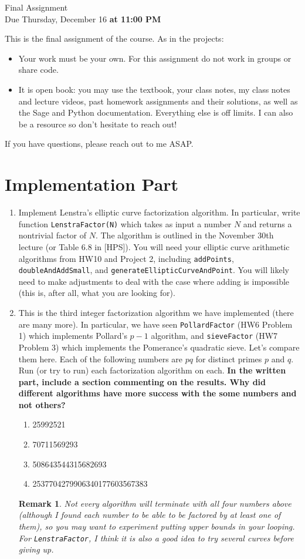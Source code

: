 \documentclass[11pt]{article}
\newtheorem*{remark}{Remark}
\begin{document}
\begin{center}
\Large {Final Assignment}\\
\small {Due Thursday, December 16 \textbf{at 11:00 PM}}
\end{center}
This is the final assignment of the course.  As in the projects:
\begin{itemize}
  \item{Your work must be your own.  For this assignment do not work in groups or share code.}
  \item{It is open book: you may use the textbook, your class notes, my class notes and lecture videos, past homework assignments and their solutions, as well as the Sage and Python documentation.  Everything else is off limits.  I can also be a resource so don't hesitate to reach out!}
\end{itemize}
If you have questions, please reach out to me ASAP.
\section*{Implementation Part}
\begin{enumerate}
  \item{
  Implement Lenstra's elliptic curve factorization algorithm.  In particular, write function \verb|LenstraFactor(N)| which takes as input a number $N$ and returns a nontrivial factor of $N$.  The algorithm is outlined in the November 30th lecture (or Table 6.8 in [HPS]).  You will need your elliptic curve arithmetic algorithms from HW10 and Project 2, including \verb|addPoints|, \verb|doubleAndAddSmall|, and \verb|generateEllipticCurveAndPoint|.  You will likely need to make adjustments to deal with the case where adding is impossible (this is, after all, what you are looking for).
  }
  \item{
  This is the third integer factorization algorithm we have implemented (there are many more).  In particular, we have seen \verb|PollardFactor| (HW6 Problem 1) which implements Pollard's $p-1$ algorithm, and \verb|sieveFactor| (HW7 Problem 3) which implements the Pomerance's quadratic sieve.  Let's compare them here.  Each of the following numbers are $pq$ for distinct primes $p$ and $q$.  Run (or try to run) each factorization algorithm on each.  \textbf{In the written part, include a section commenting on the results.  Why did different algorithms have more success with the some numbers and not others?}
  \begin{enumerate}
    \item{25992521}
    \item{70711569293}
    \item{508643544315682693}
    \item{2537704279906340177603567383}
  \end{enumerate}
  }
  \begin{remark}
    Not every algorithm will terminate with all four numbers above (although I found each number to be able to be factored by at least one of them), so you may want to experiment putting upper bounds in your looping.  For \verb|LenstraFactor|, I think it is also a good idea to try several curves before giving up.
  \end{remark}
\end{enumerate}
\end{document}
